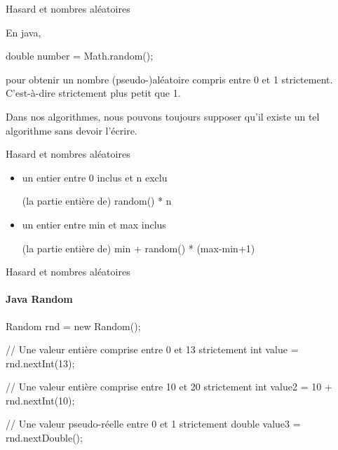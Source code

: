 \begin{hideedit}
\begin{frame}[fragile]{Hasard et nombres aléatoires}
  \subtitle{en Java}
  En java,

  \begin{java}
double number = Math.random();
  \end{java}

  pour obtenir un nombre (pseudo-)aléatoire compris entre 0 et 1 
  strictement. C'est-à-dire strictement plus petit que 1. 


  Dans nos algorithmes, nous pouvons toujours supposer qu'il existe un
  tel algorithme sans devoir l'écrire.

  \begin{center}
  \end{center}
\end{frame}

\begin{frame}{Hasard et nombres aléatoires}
  \begin{itemize}[<+->]
    \item un entier entre 0 inclus et n exclu
      \pause
      \begin{langagenaturel}
        (la partie entière de) random() * n
      \end{langagenaturel}

    \item un entier entre min et max inclus
      \pause
      \begin{langagenaturel}
        (la partie entière de) min + random() * (max-min+1)
      \end{langagenaturel}
  \end{itemize}
\end{frame}

\begin{frame}[fragile]{Hasard et nombres aléatoires}
  \framesubtitle{Java Random}
  \begin{java}
Random rnd = new Random();

// Une valeur entière comprise entre 0 et 13 strictement
int value = rnd.nextInt(13);

// Une valeur entière comprise entre 10 et 20 strictement
int value2 = 10 + rnd.nextInt(10);

// Une valeur pseudo-réelle entre 0 et 1 strictement
double value3 = rnd.nextDouble();
  \end{java}
\end{frame}


\end{hideedit}

